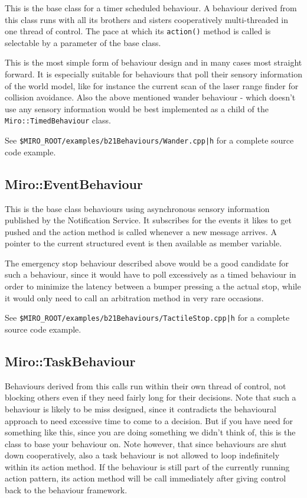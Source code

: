 This is the base class for a timer scheduled behaviour. A behaviour
derived from this class runs with all its brothers and sisters
cooperatively multi-threaded in one thread of control. The pace at
which its {\tt action()} method is called is selectable by a parameter of
the base class.

This is the most simple form of behaviour design and in many cases most
straight forward. It is especially suitable for behaviours that poll
their sensory information of the world model, like for instance the
current scan of the laser range finder for collision avoidance. Also
the above mentioned wander behaviour - which doesn't use any sensory
information would be best implemented as a child of the
{\tt Miro::TimedBehaviour} class.

See {\tt \$MIRO\_ROOT/examples/b21Behaviours/Wander.cpp|h} for a
complete source code example.

\subsection{Miro::EventBehaviour}
\label{SEC:MIRO_EVENT_BEHAVIOUR}

This is the base class behaviours using asynchronous sensory
information published by the Notification Service. It subscribes for
the events it likes to get pushed and the action method is called
whenever a new message arrives. A pointer to the current structured
event is then available as member variable.

The emergency stop behaviour described
above would be a good candidate for such a behaviour, since it would
have to poll excessively as a timed behaviour in order to minimize the
latency between a bumper pressing a the actual stop, while it would
only need to call an arbitration method in very rare occasions.

See {\tt \$MIRO\_ROOT/examples/b21Behaviours/TactileStop.cpp|h} for a
complete source code example.

\subsection{Miro::TaskBehaviour}
\label{SEC:MIRO_TASK_BEHAVIOUR}

Behaviours derived from this calls run within their own thread of
control, not blocking others even if they need fairly long for their
decisions. Note that such a behaviour is likely to be miss designed,
since it contradicts the behavioural approach to need excessive time
to come to a decision. But if you have need for something like this,
since you are doing something we didn't think of, this is the class to
base your behaviour on. Note however, that since behaviours are shut
down cooperatively, also a task behaviour is not allowed to loop
indefinitely within its action method. If the behaviour is still part
of the currently running action pattern, its action method will be
call immediately after giving control back to the behaviour framework.

